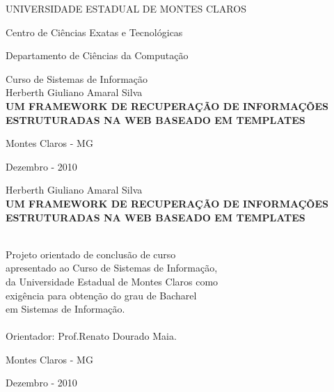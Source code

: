 \documentclass[a4paper]{report}
\begin{document}
\begin{titlepage}
\begin{center}
UNIVERSIDADE ESTADUAL DE MONTES CLAROS

Centro de Ciências Exatas e Tecnológicas

Departamento de Ciências da Computação

Curso de Sistemas de Informação
\\[2cm]
Herberth Giuliano Amaral Silva
\\[7cm]
\textbf {UM FRAMEWORK DE RECUPERAÇÃO DE INFORMAÇÕES ESTRUTURADAS NA WEB BASEADO EM TEMPLATES}

\vfill
Montes Claros - MG

Dezembro - 2010



\end{center}
\end{titlepage}

\thispagestyle{empty}
\addtocounter{page}{-1}

\begin{center}
	Herberth Giuliano Amaral Silva
	\\[10cm]
	\textbf{UM FRAMEWORK DE RECUPERAÇÃO DE INFORMAÇÕES ESTRUTURADAS NA WEB BASEADO EM TEMPLATES}
		
	\begin{flushright} 
	\ \\[3cm]
	Projeto orientado de conclusão de curso \\
	apresentado ao Curso de Sistemas de Informação, \\
	da Universidade Estadual de Montes Claros como \\
	exigência para obtenção do grau de Bacharel \\
	em Sistemas de Informação. \\
 	\ \\[1cm]
	Orientador: Prof.Renato Dourado Maia.

	\end{flushright}
	
	\vfill
	Montes Claros - MG
	
	Dezembro - 2010 
\end{center}


\renewcommand{\contentsname}{Índice}
\renewcommand{\chaptername}{Capítulo}
\renewcommand{\bibname}{Bibliografia}
\renewcommand{\lstlistingname}{Listagem}

\def\us{\char`\_}

\tableofcontents

\doublespacing







\clearpage
{}


\end{document}

